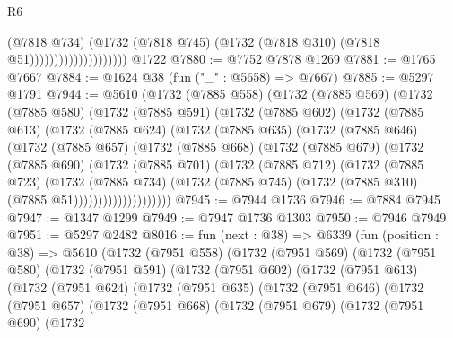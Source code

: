 \begin{lexlean}{R6}
\begin{coremodule}
                                      (@7818 @734)
                                      (@1732
                                        (@7818 @745)
                                        (@1732 (@7818 @310) (@7818 @51))))))))))))))))))))
    @1722
@7880 := @7752 @7878 @1269
@7881 := @1765 @7667
@7884 := @1624 @38 (fun ("_" : @5658) => @7667)
@7885 := @5297 @1791
@7944 := @5610
    (@1732
      (@7885 @558)
      (@1732
        (@7885 @569)
        (@1732
          (@7885 @580)
          (@1732
            (@7885 @591)
            (@1732
              (@7885 @602)
              (@1732
                (@7885 @613)
                (@1732
                  (@7885 @624)
                  (@1732
                    (@7885 @635)
                    (@1732
                      (@7885 @646)
                      (@1732
                        (@7885 @657)
                        (@1732
                          (@7885 @668)
                          (@1732
                            (@7885 @679)
                            (@1732
                              (@7885 @690)
                              (@1732
                                (@7885 @701)
                                (@1732
                                  (@7885 @712)
                                  (@1732
                                    (@7885 @723)
                                    (@1732
                                      (@7885 @734)
                                      (@1732
                                        (@7885 @745)
                                        (@1732 (@7885 @310) (@7885 @51))))))))))))))))))))
@7945 := @7944 @1736
@7946 := @7884 @7945
@7947 := @1347 @1299
@7949 := @7947 @1736 @1303
@7950 := @7946 @7949
@7951 := @5297 @2482
@8016 := fun (next : @38) =>
  @6339
    (fun (position : @38) =>
    @5610
      (@1732
        (@7951 @558)
        (@1732
          (@7951 @569)
          (@1732
            (@7951 @580)
            (@1732
              (@7951 @591)
              (@1732
                (@7951 @602)
                (@1732
                  (@7951 @613)
                  (@1732
                    (@7951 @624)
                    (@1732
                      (@7951 @635)
                      (@1732
                        (@7951 @646)
                        (@1732
                          (@7951 @657)
                          (@1732
                            (@7951 @668)
                            (@1732
                              (@7951 @679)
                              (@1732
                                (@7951 @690)
                                (@1732

\end{coremodule}
\end{lexlean}
